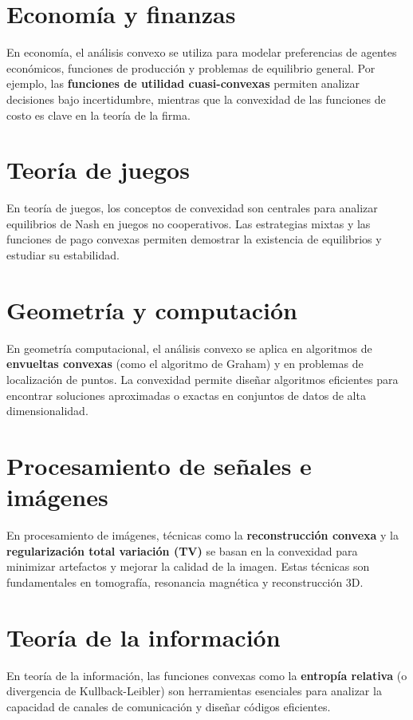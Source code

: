 \documentclass[12pt]{book}
\theoremstyle{definition}
\theoremstyle{plain}
\theoremstyle{remark}
\begin{document}
\section{Economía y finanzas}
En economía, el análisis convexo se utiliza para modelar preferencias de agentes económicos, funciones de producción y problemas de equilibrio general. Por ejemplo, las \textbf{funciones de utilidad cuasi-convexas} permiten analizar decisiones bajo incertidumbre, mientras que la convexidad de las funciones de costo es clave en la teoría de la firma.

\section{Teoría de juegos}
En teoría de juegos, los conceptos de convexidad son centrales para analizar equilibrios de Nash en juegos no cooperativos. Las estrategias mixtas y las funciones de pago convexas permiten demostrar la existencia de equilibrios y estudiar su estabilidad.

\section{Geometría y computación}
En geometría computacional, el análisis convexo se aplica en algoritmos de \textbf{envueltas convexas} (como el algoritmo de Graham) y en problemas de localización de puntos. La convexidad permite diseñar algoritmos eficientes para encontrar soluciones aproximadas o exactas en conjuntos de datos de alta dimensionalidad.

\section{Procesamiento de señales e imágenes}
En procesamiento de imágenes, técnicas como la \textbf{reconstrucción convexa} y la \textbf{regularización total variación (TV)} se basan en la convexidad para minimizar artefactos y mejorar la calidad de la imagen. Estas técnicas son fundamentales en tomografía, resonancia magnética y reconstrucción 3D.

\section{Teoría de la información}
En teoría de la información, las funciones convexas como la \textbf{entropía relativa} (o divergencia de Kullback-Leibler) son herramientas esenciales para analizar la capacidad de canales de comunicación y diseñar códigos eficientes.
\end{document}
